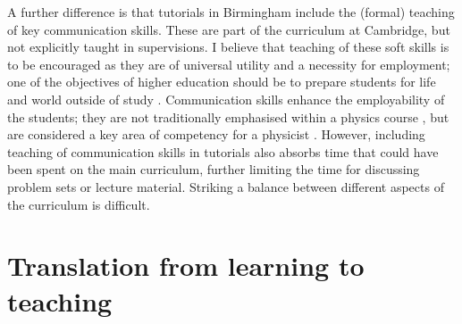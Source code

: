 A further difference is that tutorials in Birmingham include the (formal) teaching of key communication skills. These are part of the curriculum at Cambridge, but not explicitly taught in supervisions. %
I believe that teaching of these soft skills is to be encouraged as they are of universal utility and a necessity for employment; one of the objectives of higher education should be to prepare students for life and world outside of study \citep{Fallows2000,Harvey2000}. Communication skills enhance the employability of the students; they are not traditionally emphasised within a physics course \citep[cf.][]{Sharma2007}, but are considered a key area of competency for a physicist \citep{Gonsalves2014a}. However, including teaching of communication skills in tutorials also absorbs time that could have been spent on the main curriculum, further limiting the time for discussing problem sets or lecture material. Striking a balance between different aspects of the curriculum is difficult.



 

\section{Translation from learning to teaching}

